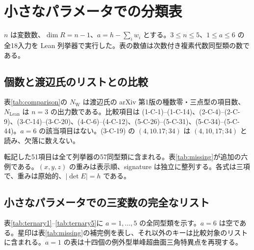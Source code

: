\clearpage
\appendix
\section{小さなパラメータでの分類表}
\label{app:tables}

$n$ は変数数、$\dim R=n-1$、$a=h-\sum_iw_i$ とする。$3\leq n\leq5$、$1\leq a\leq6$ の全18入力を Lean 列挙器で実行した。表の数値は次数付き複素代数同型類の数である。

\subsection{個数と渡辺氏のリストとの比較}
\begin{table}[htbp]
\centering

\caption{小さな $n,a$ に対する同型類の全個数。}
\label{tab:counts}
\end{table}

表\ref{tab:comparison}の $N_{\mathrm W}$ は渡辺氏の arXiv 第1版\cite{Watanabe}の種数零・三点型の項目数、$N_{\mathrm{Lean}}$ は $n=3$ の出力数である。比較項目は (1-C-1)--(1-C-14)、(2-C-4)--(2-C-9)、(3-C-14)--(3-C-20)、(4-C-6)--(4-C-12)、(5-C-26)--(5-C-31)、(5-C-34)--(5-C-44)。$a=6$ の該当項目はない。(3-C-19) の $(4,10.17;34)$ は $(4,10,17;34)$ と読み、欠落に数えない。

\begin{table}[htbp]
\centering

\caption{\texttt{arXiv:1401.0789v1} の指定した三点型項目との比較。}
\label{tab:comparison}
\end{table}

転記した51項目は全て列挙器の57同型類に含まれる。表\ref{tab:missing}が追加の六例である。$(x,y,z)$ の重みは表示順、signature は独立に整列する。各式は三項で、重みは原始的、$|\det E|=h$ である。

\begin{table}[htbp]
\centering\small

\caption{比較対象のリストに載っていない六つの重み系。}
\label{tab:missing}
\end{table}

\clearpage
\subsection{小さなパラメータでの三変数の完全なリスト}
表\ref{tab:ternary1}--\ref{tab:ternary5}に $a=1,\ldots,5$ の全同型類を示す。$a=6$ は空である。星印は表\ref{tab:missing}の補完例を表し、それ以外のキーは比較対象のリストに含まれる。$a=1$ の表は十四個の例外型単峰超曲面三角特異点を再現する。

